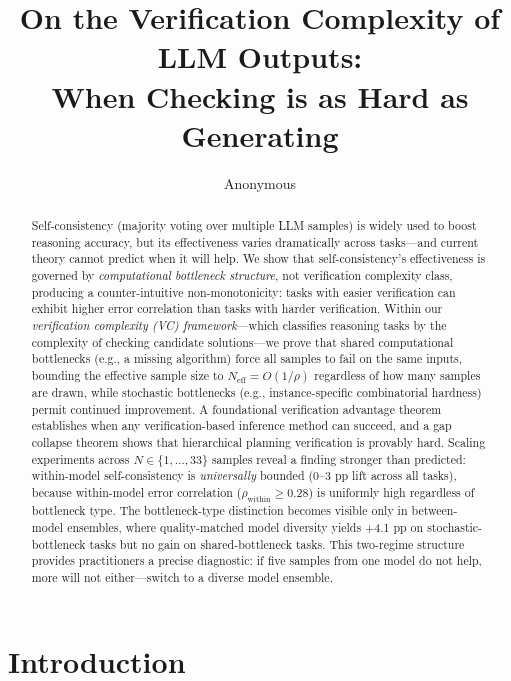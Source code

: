 \documentclass{article}
\title{On the Verification Complexity of LLM Outputs:\\ When Checking is as Hard as Generating}
\author{Anonymous}
\date{}
\theoremstyle{definition}
\theoremstyle{remark}
\begin{document}
\maketitle

\begin{abstract}
Self-consistency (majority voting over multiple LLM samples) is widely used to boost reasoning accuracy, but its effectiveness varies dramatically across tasks---and current theory cannot predict when it will help.
We show that self-consistency's effectiveness is governed by \emph{computational bottleneck structure}, not verification complexity class, producing a counter-intuitive non-monotonicity: tasks with easier verification can exhibit higher error correlation than tasks with harder verification.
Within our \emph{verification complexity (VC) framework}---which classifies reasoning tasks by the complexity of checking candidate solutions---we prove that shared computational bottlenecks (e.g., a missing algorithm) force all samples to fail on the same inputs, bounding the effective sample size to $N_{\text{eff}} = O(1/\rho)$ regardless of how many samples are drawn, while stochastic bottlenecks (e.g., instance-specific combinatorial hardness) permit continued improvement.
A foundational verification advantage theorem establishes when any verification-based inference method can succeed, and a gap collapse theorem shows that hierarchical planning verification is provably hard.
Scaling experiments across $N \in \{1,\ldots,33\}$ samples reveal a finding stronger than predicted: within-model self-consistency is \emph{universally} bounded (0--3 pp lift across all tasks), because within-model error correlation ($\rho_{\text{within}} \geq 0.28$) is uniformly high regardless of bottleneck type.
The bottleneck-type distinction becomes visible only in between-model ensembles, where quality-matched model diversity yields +4.1 pp on stochastic-bottleneck tasks but no gain on shared-bottleneck tasks.
This two-regime structure provides practitioners a precise diagnostic: if five samples from one model do not help, more will not either---switch to a diverse model ensemble.
\end{abstract}

\section{Introduction}
\label{sec:intro}
\end{document}
